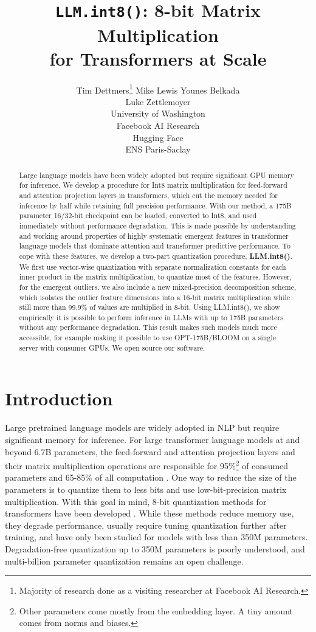 \documentclass{article}
\title{\texttt{LLM.int8()}: 8-bit Matrix Multiplication \\ for Transformers at Scale}
\author{Tim Dettmers\thanks{Majority of research done as a visiting researcher at Facebook AI Research.} \And Mike Lewis \And Younes Belkada \\\And Luke Zettlemoyer
  \AND \\ University of Washington \\Facebook AI Research\\ Hugging Face\\ ENS Paris-Saclay
}
\begin{document}
\maketitle

\begin{abstract}
Large language models have been widely adopted but require significant GPU memory for inference. We develop a procedure for Int8 matrix multiplication for feed-forward and attention projection layers in transformers, which cut the memory needed for inference by half while retaining full precision performance. With our method, a 175B parameter 16/32-bit checkpoint can be loaded, converted to Int8, and used immediately without performance degradation. This is made possible by understanding and working around properties of highly systematic emergent features in transformer language models that dominate attention and transformer predictive performance. To cope with these features, we develop a two-part quantization procedure, {\bf LLM.int8()}. We first use vector-wise quantization with separate normalization constants for each inner product in the matrix multiplication, to quantize most of the features. However, for the emergent outliers, we also include a new mixed-precision decomposition scheme, which isolates the outlier feature dimensions into a 16-bit matrix multiplication while still more than 99.9\% of values are multiplied in 8-bit. Using LLM.int8(), we show empirically it is possible to perform inference in LLMs with up to 175B parameters without any performance degradation. This result makes such models much more accessible, for example making it possible to use OPT-175B/BLOOM on a single server with consumer GPUs.
We open source our software.

\end{abstract}

\section{Introduction}

Large pretrained language models are widely adopted in NLP \citep{vaswani2017attention,radford2019language, brown2020language, zhang2022opt} but require significant memory for inference. For large transformer language models at and beyond 6.7B parameters, the feed-forward and attention projection layers and their matrix multiplication operations are responsible for 95\%\footnote{Other parameters come mostly from the embedding layer. A tiny amount comes from norms and biases.} of consumed parameters and 65-85\% of all computation \citep{ilharco-etal-2020-high}. One way to reduce the size of the parameters is to quantize them to less bits and use low-bit-precision matrix multiplication. With this goal in mind, 8-bit quantization methods for transformers have been developed \citep{chen2020statistical, lin2020towards, zafrir2019q8bert,shen2020q}. 
While these methods reduce memory use, they degrade performance, usually require tuning quantization further after training, and have only been studied for models with less than 350M parameters. Degradation-free quantization up to 350M parameters is poorly understood, and multi-billion parameter quantization remains an open challenge.
\end{document}
